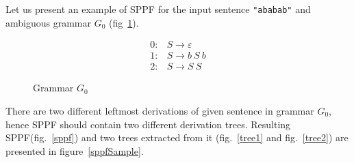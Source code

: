 Let us present an example of SPPF for the input sentence \verb|"ababab"| and ambiguous grammar $G_0$ (fig~\ref{grammarG0}).

\begin{figure}[h]
   \begin{center}
   \[
\begin{array}{rl}

   0: & S \rightarrow \varepsilon  \\
   1: & S \rightarrow b \ S \ b \\
   2: & S \rightarrow S \ S    
\end{array}
\]
   \caption{Grammar $G_0$}
   \label{grammarG0}        
   \end{center}
\end{figure}


There are two different leftmost derivations of given sentence in grammar $G_0$, hence SPPF should contain two different derivation trees. Resulting SPPF(fig.~\ref{sppf}) and two trees extracted from it (fig.~\ref{tree1} and fig.~\ref{tree2}) are presented in figure~\ref{sppfSample}. 
 
